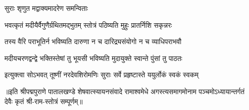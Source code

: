 
\onelineshloka
{सुराः शृणुत मद्वाक्यमादरेण समन्विताः} %

\twolineshloka
{भवत्कृतं मदीयैर्वैगुणैर्ग्रथितमद्भुतम्}
{स्तोत्रं पठिष्यति मुहुः प्रातर्निशि सकृन्नरः} %

\twolineshloka
{तस्य वैरि पराभूतिर्न भविष्यति दारुणा}
{न च दारिद्र्यसंयोगो न च व्याधिपराभवौ} %

\twolineshloka
{मदीयचरणद्वन्द्वे भक्तिस्तेषां तु भूयसी}
{भविष्यति मुदायुक्ते स्वान्ते पुंसां तु पाठतः} %

\twolineshloka
{इत्युक्त्वा सोऽभवत् तूष्णीं नरदेवशिरोमणिः}
{सुराः सर्वे प्रहृष्टास्ते ययुर्लोकं स्वकं स्वकम्} %

॥इति श्रीपद्मपुराणे पातालखण्डे शेषवात्स्यायनसंवादे रामाश्वमेधे अगस्त्यसमागमोनाम पञ्चमोऽध्यायान्तर्गतं देवैः कृतं श्री-राम-स्तोत्रं सम्पूर्णम्॥
